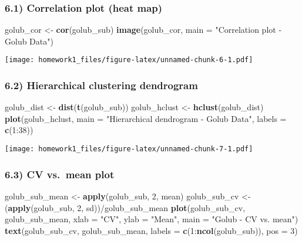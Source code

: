 \documentclass[]{article}
\newenvironment{Shaded}{\begin{snugshade}}{\end{snugshade}}
\newcommand{\KeywordTok}[1]{\textcolor[rgb]{0.13,0.29,0.53}{\textbf{{#1}}}}
\newcommand{\DataTypeTok}[1]{\textcolor[rgb]{0.13,0.29,0.53}{{#1}}}
\newcommand{\DecValTok}[1]{\textcolor[rgb]{0.00,0.00,0.81}{{#1}}}
\newcommand{\StringTok}[1]{\textcolor[rgb]{0.31,0.60,0.02}{{#1}}}
\newcommand{\NormalTok}[1]{{#1}}
\begin{document}
\subsubsection{6.1) Correlation plot (heat
map)}\label{correlation-plot-heat-map}

\begin{Shaded}
\begin{Highlighting}[]
\NormalTok{golub_cor <-}\StringTok{ }\KeywordTok{cor}\NormalTok{(golub_sub)}
\KeywordTok{image}\NormalTok{(golub_cor, }\DataTypeTok{main =} \StringTok{"Correlation plot - Golub Data"}\NormalTok{)}
\end{Highlighting}
\end{Shaded}

\texttt{[image: homework1\_files/figure-latex/unnamed-chunk-6-1.pdf]}
\newpage

\subsubsection{6.2) Hierarchical clustering
dendrogram}\label{hierarchical-clustering-dendrogram}

\begin{Shaded}
\begin{Highlighting}[]
\NormalTok{golub_dist <-}\StringTok{ }\KeywordTok{dist}\NormalTok{(}\KeywordTok{t}\NormalTok{(golub_sub))}
\NormalTok{golub_hclust <-}\StringTok{ }\KeywordTok{hclust}\NormalTok{(golub_dist)}
\KeywordTok{plot}\NormalTok{(golub_hclust, }\DataTypeTok{main =} \StringTok{"Hierarchical dendrogram - Golub Data"}\NormalTok{, }\DataTypeTok{labels =} \KeywordTok{c}\NormalTok{(}\DecValTok{1}\NormalTok{:}\DecValTok{38}\NormalTok{))}
\end{Highlighting}
\end{Shaded}

\texttt{[image: homework1\_files/figure-latex/unnamed-chunk-7-1.pdf]}
\newpage

\subsubsection{6.3) CV vs.~mean plot}\label{cv-vs.mean-plot}

\begin{Shaded}
\begin{Highlighting}[]
\NormalTok{golub_sub_mean <-}\StringTok{ }\KeywordTok{apply}\NormalTok{(golub_sub, }\DecValTok{2}\NormalTok{, mean)}
\NormalTok{golub_sub_cv <-}\StringTok{ }\NormalTok{(}\KeywordTok{apply}\NormalTok{(golub_sub, }\DecValTok{2}\NormalTok{, sd))/golub_sub_mean}
\KeywordTok{plot}\NormalTok{(golub_sub_cv, golub_sub_mean, }\DataTypeTok{xlab =} \StringTok{"CV"}\NormalTok{, }\DataTypeTok{ylab =} \StringTok{"Mean"}\NormalTok{,}
     \DataTypeTok{main =} \StringTok{"Golub - CV vs. mean"}\NormalTok{)}
\KeywordTok{text}\NormalTok{(golub_sub_cv, golub_sub_mean, }\DataTypeTok{labels =} \KeywordTok{c}\NormalTok{(}\DecValTok{1}\NormalTok{:}\KeywordTok{ncol}\NormalTok{(golub_sub)), }\DataTypeTok{pos =} \DecValTok{3}\NormalTok{)}
\end{Highlighting}
\end{Shaded}
\end{document}
